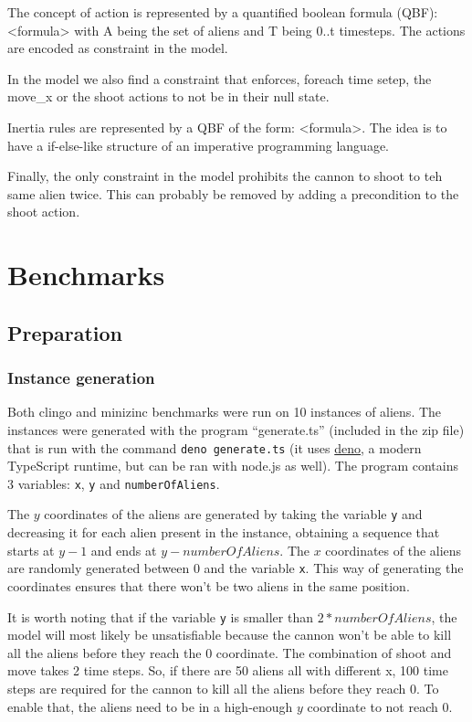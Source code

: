 \documentclass[11pt]{article}
\begin{document}
The concept of action is represented by a quantified boolean formula (QBF): <formula> with A being the set of aliens and T being 0..t timesteps. The actions are encoded as constraint in the model.

In the model we also find a constraint that enforces, foreach time setep, the move\_x or the shoot actions to not be in their null state.

Inertia rules are represented by a QBF of the form: <formula>. The idea is to have a if-else-like structure of an imperative programming language.

Finally, the only constraint in the model prohibits the cannon to shoot to teh same alien twice. This can probably be removed by adding a precondition to the shoot action.

\section{Benchmarks}

\subsection{Preparation}

\subsubsection{Instance generation}
Both clingo and minizinc benchmarks were run on 10 instances of aliens. 
The instances were generated with the program ``generate.ts'' (included in the zip file) that is run with the command \verb|deno generate.ts| (it uses \href{https://deno.com/}{deno}, a modern TypeScript runtime, but can be ran with node.js as well). 
The program contains 3 variables: \verb|x|, \verb|y| and \verb|numberOfAliens|.

The $y$ coordinates of the aliens are generated by taking the variable \verb|y| and decreasing it for each alien present in the instance, obtaining a sequence that starts at $y - 1$ and ends at $y - numberOfAliens$.
The $x$ coordinates of the aliens are randomly generated between 0 and the variable \verb|x|. 
This way of generating the coordinates ensures that there won't be two aliens in the same position.

It is worth noting that if the variable \verb|y| is smaller than $2*numberOfAliens$, the model will most likely be unsatisfiable because the cannon won't be able to kill all the aliens before they reach the $0$ coordinate. 
The combination of shoot and move takes 2 time steps. 
So, if there are 50 aliens all with different x, 100 time steps are required for the cannon to kill all the aliens before they reach 0. 
To enable that, the aliens need to be in a high-enough $y$ coordinate to not reach 0.
\end{document}
